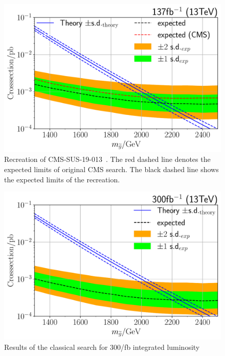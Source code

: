 \documentclass[prd, twocolumn, superscriptaddress,floatfix, nofootinbib, preprintnumbers]{revtex4-2}
\begin{document}
\begin{figure}[h]
\centering
\includegraphics[width=0.9\linewidth]{137fb_clean.pdf}
\caption{Recreation of CMS-SUS-19-013~\cite{CMS:2020fia}. The red dashed line denotes the expected limits of original CMS search. The black dashed line shows the expected limits of the recreation.}
\label{fig:results}
\end{figure}

\begin{figure}[h]
\centering
\includegraphics[width=0.9\linewidth]{300fb.pdf}
\caption{Results of the classical search for 300/fb  integrated luminosity}
\label{fig:result300}
\end{figure}
\end{document}
